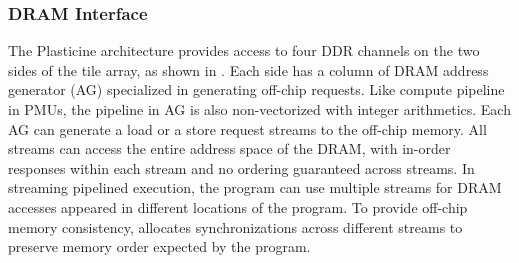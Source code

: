 \subsubsection{DRAM Interface}
The Plasticine architecture provides access to four DDR channels on the two sides of the
tile array, as shown in . 
Each side has a column of DRAM address generator (AG) specialized in generating off-chip
requests. Like compute pipeline in PMUs, the pipeline in AG is also non-vectorized with integer
arithmetics. Each AG can generate a load or a store request streams to the off-chip memory. All
streams can access the entire address space of the DRAM, with in-order responses within each stream
and no ordering guaranteed across streams. 
In streaming pipelined execution, the program can use multiple streams for DRAM accesses appeared in
different locations of the program.
To provide off-chip memory consistency, \name allocates
synchronizations across different streams to preserve memory order expected by the program.

